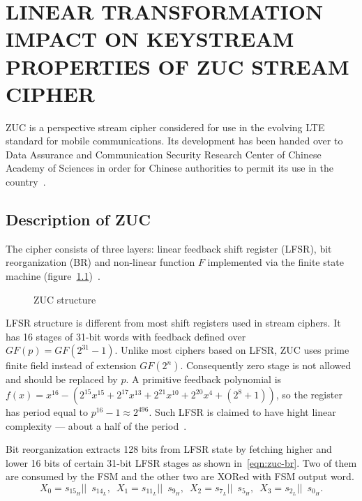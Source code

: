 % 

\chapter{LINEAR TRANSFORMATION IMPACT ON KEYSTREAM PROPERTIES OF ZUC STREAM CIPHER}
\label{sec:zuc}

ZUC is a perspective stream cipher considered for use in the evolving LTE standard
for mobile communications. Its development has been handed over to Data Assurance and
Communication Security Research Center of Chinese Academy of Sciences in order
for Chinese authorities to permit its use in the country~\cite{3gpp:eea3_doc4}.

\section{Description of ZUC}


The cipher consists of three layers: linear feedback shift register (LFSR), bit
reorganization (BR) and non-linear function $F$ implemented via the finite state
machine (figure~\ref{fig:zuc})~\cite{3gpp:eea3_doc2}.
\begin{figure}[htbp]
    \centering
    
    \caption{ZUC structure}
    \label{fig:zuc}
\end{figure}

LFSR structure is different from most shift registers used in stream
ciphers. It has 16 stages of 31-bit words with feedback defined over
$GF(p) = GF(2^{31}-1)$. Unlike most ciphers based on LFSR, ZUC uses prime finite field
instead of extension $GF(2^n)$. Consequently zero stage is not allowed and
should be replaced by $p$. A primitive feedback polynomial is 
\mbox{$f(x) = x^{16} - (2^{15} x^{15} + 2^{17} x^{13} + 2^{21} x^{10} + 2^{20} x^4 + (2^8 + 1))$}, 
so the register has period equal to $p^{16} -1 \approx 2^{496}$. Such LFSR is
claimed to have hight linear complexity --- about a half of the
period~\cite{3gpp:eea3_doc4}.

Bit reorganization extracts 128 bits from LFSR state by fetching higher and
lower 16 bits of certain 31-bit LFSR stages as shown in~\eqref{eqn:zuc-br}. Two of them are consumed by
the FSM and the other two are XORed with FSM output word.
\begin{equation}
    \label{eqn:zuc-br}
        X_0 = s_{15_H} || \enspace s_{14_L}, \enspace
        X_1 = s_{11_L} || \enspace s_{9_H}, \enspace
        X_2 = s_{7_L}  || \enspace s_{5_H}, \enspace
        X_3 = s_{2_L}  || \enspace s_{0_H}.
\end{equation}

